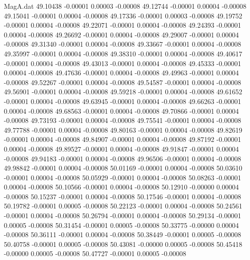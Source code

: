 \begin{filecontents}{MagA.dat}
  49.10438   -0.00001    0.00003   -0.00008
  49.12744   -0.00001    0.00004   -0.00008
  49.15041   -0.00001    0.00004   -0.00008
  49.17336   -0.00001    0.00003   -0.00008
  49.19752   -0.00001    0.00004   -0.00008
  49.22071   -0.00001    0.00004   -0.00008
  49.24393   -0.00001    0.00004   -0.00008
  49.26692   -0.00001    0.00004   -0.00008
  49.29007   -0.00001    0.00004   -0.00008
  49.31340   -0.00001    0.00004   -0.00008
  49.33667   -0.00001    0.00004   -0.00008
  49.35997   -0.00001    0.00004   -0.00008
  49.38310   -0.00001    0.00004   -0.00008
  49.40617   -0.00001    0.00004   -0.00008
  49.43013   -0.00001    0.00004   -0.00008
  49.45333   -0.00001    0.00004   -0.00008
  49.47636   -0.00001    0.00004   -0.00008
  49.49963   -0.00001    0.00004   -0.00008
  49.52267   -0.00001    0.00004   -0.00008
  49.54587   -0.00001    0.00004   -0.00008
  49.56901   -0.00001    0.00004   -0.00008
  49.59218   -0.00001    0.00004   -0.00008
  49.61652   -0.00001    0.00004   -0.00008
  49.63945   -0.00001    0.00004   -0.00008
  49.66263   -0.00001    0.00004   -0.00008
  49.68563   -0.00001    0.00004   -0.00008
  49.70866   -0.00001    0.00004   -0.00008
  49.73193   -0.00001    0.00004   -0.00008
  49.75541   -0.00001    0.00004   -0.00008
  49.77788   -0.00001    0.00004   -0.00008
  49.80163   -0.00001    0.00004   -0.00008
  49.82619   -0.00001    0.00004   -0.00008
  49.84907   -0.00001    0.00004   -0.00008
  49.87192   -0.00001    0.00004   -0.00008
  49.89527   -0.00001    0.00004   -0.00008
  49.91847   -0.00001    0.00004   -0.00008
  49.94183   -0.00001    0.00004   -0.00008
  49.96506   -0.00001    0.00004   -0.00008
  49.98842   -0.00001    0.00004   -0.00008
  50.01169   -0.00001    0.00004   -0.00008
  50.03610   -0.00001    0.00004   -0.00008
  50.05929   -0.00001    0.00004   -0.00008
  50.08263   -0.00001    0.00004   -0.00008
  50.10566   -0.00001    0.00004   -0.00008
  50.12910   -0.00000    0.00004   -0.00008
  50.15237   -0.00001    0.00004   -0.00008
  50.17546   -0.00001    0.00004   -0.00008
  50.19782   -0.00001    0.00005   -0.00008
  50.22123   -0.00001    0.00004   -0.00008
  50.24561   -0.00001    0.00004   -0.00008
  50.26794   -0.00001    0.00004   -0.00008
  50.29134   -0.00001    0.00005   -0.00008
  50.31454   -0.00001    0.00005   -0.00008
  50.33775   -0.00000    0.00004   -0.00008
  50.36111   -0.00001    0.00004   -0.00008
  50.38449   -0.00001    0.00005   -0.00008
  50.40758   -0.00001    0.00005   -0.00008
  50.43081   -0.00000    0.00005   -0.00008
  50.45418   -0.00000    0.00005   -0.00008
  50.47727   -0.00001    0.00005   -0.00008

\end{filecontents}

